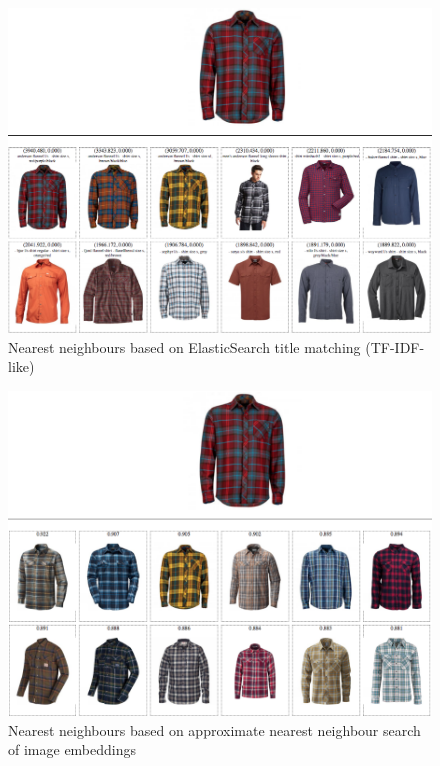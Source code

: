 \begin{figure}
  \includegraphics[width=\linewidth]{figures/compare/shirt_es}
  \caption{Nearest neighbours based on ElasticSearch title matching (TF-IDF-like)}
  \label{shirt_es}
\end{figure}
\begin{figure}
  \includegraphics[width=\linewidth]{figures/compare/shirt_nmslib}
  \caption{Nearest neighbours based on approximate nearest neighbour search of image embeddings}
  \label{shirt_nmslib}
\end{figure}

